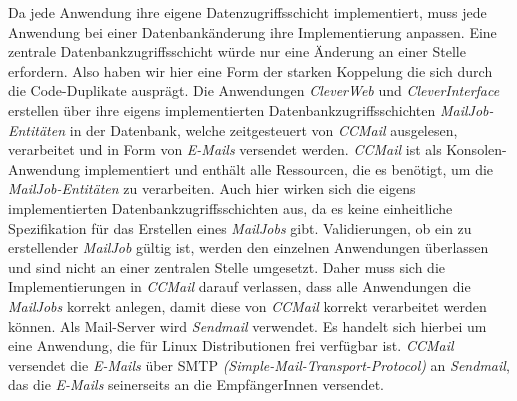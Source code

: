 Da jede Anwendung ihre eigene Datenzugriffsschicht implementiert, muss jede Anwendung bei einer Datenbankänderung ihre Implementierung anpassen. Eine zentrale Datenbankzugriffsschicht würde nur eine Änderung an einer Stelle erfordern. Also haben wir hier eine Form der starken Koppelung die sich durch die Code-Duplikate ausprägt.
\newline
\newline
Die Anwendungen \emph{CleverWeb} und \emph{CleverInterface} erstellen über ihre eigens implementierten Datenbankzugriffsschichten \emph{MailJob-Entitäten} in der Datenbank, welche zeitgesteuert von \emph{CCMail} ausgelesen, verarbeitet und in Form von \emph{E-Mails} versendet werden. \emph{CCMail} ist als Konsolen-Anwendung implementiert und enthält alle Ressourcen, die es benötigt, um die \emph{MailJob-Entitäten} zu verarbeiten. Auch hier wirken sich die eigens implementierten Datenbankzugriffsschichten aus, da es keine einheitliche Spezifikation für das Erstellen eines \emph{MailJobs} gibt. Validierungen, ob ein zu erstellender \emph{MailJob} gültig ist, werden den einzelnen Anwendungen überlassen und sind nicht an einer zentralen Stelle umgesetzt. Daher muss sich die Implementierungen in \emph{CCMail} darauf verlassen, dass alle Anwendungen die \emph{MailJobs} korrekt anlegen, damit diese von \emph{CCMail} korrekt verarbeitet werden können.
\newline
\newline
Als Mail-Server wird \emph{Sendmail} verwendet. Es handelt sich hierbei um eine Anwendung, die für Linux Distributionen frei verfügbar ist. \emph{CCMail} versendet die \emph{E-Mails} über SMTP \emph{(Simple-Mail-Transport-Protocol)} an \emph{Sendmail}, das die \emph{E-Mails} seinerseits an die EmpfängerInnen versendet.

\newpage
